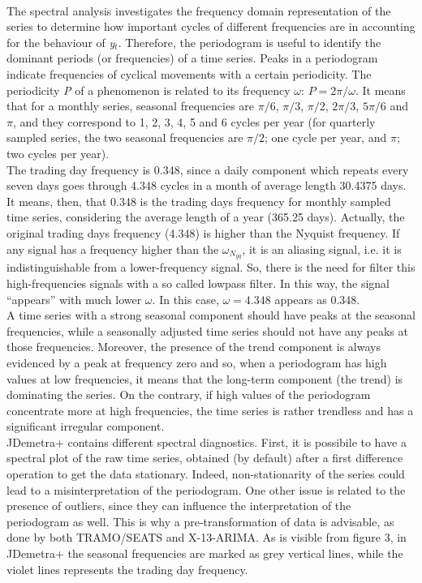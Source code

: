 \documentclass{article}
\begin{document}
\\The spectral analysis investigates the frequency domain representation of the series to determine how important cycles of different frequencies are in accounting for the behaviour of \textit{y$_t$}. Therefore, the periodogram is useful to identify the dominant periods (or frequencies) of a time series. Peaks in a periodogram indicate frequencies of cyclical movements with a certain periodicity. The periodicity \textit{P} of a phenomenon is related to its frequency $\omega$: $P=2 \pi / \omega$. It means that for a monthly series, seasonal frequencies are $\pi/6$, $\pi/3$, $\pi/2$, $2\pi/3$, $5\pi/6$ and $\pi$, and they correspond to 1, 2, 3, 4, 5 and 6 cycles per year (for quarterly sampled series, the two seasonal frequencies are $\pi/2$; one cycle per year, and $\pi$; two cycles per year).\\The trading day frequency is 0.348, since a daily component which repeats every seven days goes through 4.348 cycles in a month of average length 30.4375 days. It means, then, that 0.348 is the trading days frequency for monthly sampled time series, considering the average length of a year (365.25 days). Actually, the original trading days frequency (4.348) is higher than the Nyquist frequency. {\color{red} If any signal has a frequency higher than the $\omega_{N_{yq}}$, it is an aliasing signal, i.e. it is indistinguishable from a lower-frequency signal. So, there is the need for filter this high-frequencies signals with a so called lowpass filter. In this way, the signal “appears” with much lower $\omega$. In this case, $\omega=4.348$ appears as 0.348.}\\A time series with a strong seasonal component should have peaks at the seasonal frequencies, while a seasonally adjusted time series should not have any peaks at those frequencies. Moreover, the presence of the trend component is always evidenced by a peak at frequency zero and so, when a periodogram has high values at low frequencies, it means that the long-term component (the trend) is dominating the series. On the contrary, if high values of the periodogram concentrate more at high frequencies, the time series is rather trendless and has a significant irregular component.\\JDemetra+ contains different spectral diagnostics. First, it is possibile to have a spectral plot of the raw time series, obtained (by default) after a first difference operation to get the data stationary. Indeed, non-stationarity of the series could lead to a misinterpretation of the periodogram.  One other issue is related to the presence of outliers, since they can influence the interpretation of the periodogram as well. This is why a pre-transformation of data is advisable, as done by both TRAMO/SEATS and X-13-ARIMA.  As is visible from figure 3, in JDemetra+ the seasonal frequencies are marked as grey vertical lines, while the violet lines represents the trading day frequency.\\
\end{document}
